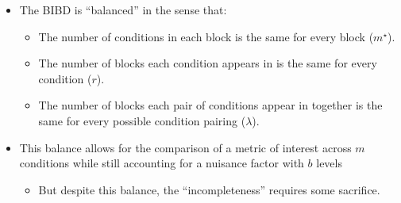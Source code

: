 \begin{itemize}
          \begin{Remark}{Notation}{}
              \begin{itemize}
                  \item $ m $: number of experimental conditions. In our previous example, $ m=3 $.
                  \item $ b $: number of blocks. In our previous example, $ b=6 $.
                  \item $ m^\star $: number of experimental conditions that can be run in each block. Also known as ``block size.'' In our previous example, $ m^\star=2 $.
                        \begin{itemize}
                            \item RCBD\@: $ m^\star=m $.
                            \item BIBD\@: $ m^\star<m $.
                        \end{itemize}
                  \item $ r $: number of blocks in which each condition appears. In our previous example, $ r=4 $.
                  \item $ \lambda $: number of blocks that \emph{any} pair of conditions appear in together. In our previous example, $ \lambda=2 $.
              \end{itemize}
          \end{Remark}
    \item The BIBD is ``balanced'' in the sense that:
          \begin{itemize}
              \item The number of conditions in each block is the same for every block ($ m^\star $).
              \item The number of blocks each condition appears in is the same for every condition ($ r $).
              \item The number of blocks each pair of conditions appear in together is the same for every possible
                    condition pairing ($ \lambda $).
          \end{itemize}
    \item This balance allows for the comparison of a metric of interest across $m$ conditions while still accounting
          for a nuisance factor with $b$ levels
          \begin{itemize}
              \item But despite this balance, the ``incompleteness'' requires some sacrifice.
          \end{itemize}
\end{itemize}
